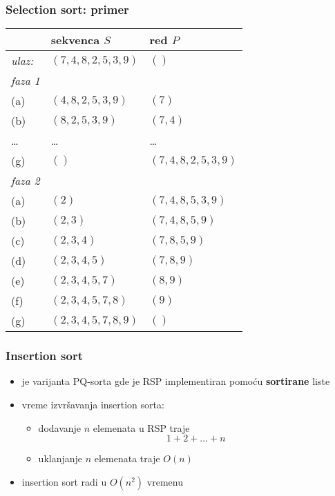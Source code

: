 \documentclass[compress,aspectratio=169]{beamer}
\begin{document}
\begin{frame}
  \frametitle{Selection sort: primer}
  \begin{center}
    \begin{tabular}{lll}
       & \textbf{sekvenca $S$} & \textbf{red $P$} \\ \hline\hline
      \textit{ulaz:} & $(7,4,8,2,5,3,9)$ & $()$ \\ \hline
      \textit{faza 1} &  & \\ 
      (a) & $(4,8,2,5,3,9)$ & $(7)$ \\ 
      (b) & $(8,2,5,3,9)$ & $(7,4)$ \\ 
      \ldots & \ldots & \ldots \\
      (g) & $()$ & $(7,4,8,2,5,3,9)$ \\ \hline
      \textit{faza 2} &  & \\ 
      (a) & $(2)$ & $(7,4,8,5,3,9)$ \\ 
      (b) & $(2,3)$ & $(7,4,8,5,9)$ \\ 
      (c) & $(2,3,4)$ & $(7,8,5,9)$ \\ 
      (d) & $(2,3,4,5)$ & $(7,8,9)$ \\ 
      (e) & $(2,3,4,5,7)$ & $(8,9)$ \\ 
      (f) & $(2,3,4,5,7,8)$ & $(9)$ \\ 
      (g) & $(2,3,4,5,7,8,9)$ & $()$
    \end{tabular}
  \end{center}
\end{frame}

\begin{frame}[fragile]
  \frametitle{Insertion sort}
  \begin{itemize}
    \item {} je varijanta PQ-sorta gde je RSP implementiran pomoću \textbf{sortirane} liste
    \item vreme izvršavanja insertion sorta:
    \begin{itemize}
      \item dodavanje $n$ elemenata u RSP traje \\
      $$1 + 2 + \ldots + n$$ 
      \item uklanjanje $n$ elemenata traje $O(n)$
    \end{itemize}
    \item insertion sort radi u $O(n^2)$ vremenu
  \end{itemize}
\end{frame}
\end{document}
